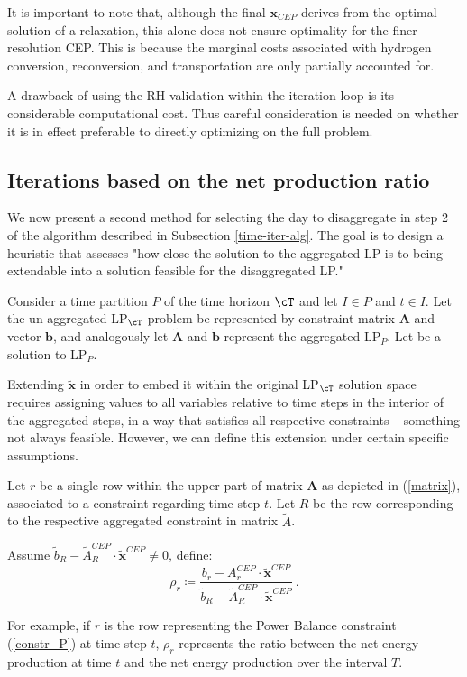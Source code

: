 \documentclass[smallextended,natbib]{svjour3}       %
\numberwithin{definition}{section}
\numberwithin{theorem}{section}
\numberwithin{proposition}{section}
\begin{document}
It is important to note that, although the final $\mathbf{x}_{CEP}$ derives from the optimal solution of a relaxation, this alone does not ensure optimality for the finer-resolution CEP. 
This is because the marginal costs associated with hydrogen conversion, reconversion, and transportation are only partially accounted for.%

A drawback of using the RH validation within the iteration loop is its considerable computational cost. Thus careful consideration is needed on whether it is in effect preferable to directly optimizing on the full problem.

\subsection{Iterations based on the net production ratio}\label{subsection: rho}  

We now present a second method for selecting the day to disaggregate in step 2 of the algorithm described in Subsection \ref{time-iter-alg}. 
The goal is to design a heuristic that assesses "how close the solution to the aggregated LP is to being extendable into a solution feasible for the disaggregated LP."

Consider a time partition $P$ of the time horizon $\cT$ and let \(I \in P\) and \(t \in I\).
Let the un-aggregated LP$_{\cT}$ problem be represented by constraint matrix $\mathbf{A}$ and vector $\mathbf{b}$, and analogously let $\tilde{\mathbf{A}}$ and $\tilde{\mathbf{b}}$ represent the aggregated LP$_P$.
Let  be a solution to LP$_P$.

Extending \(\tilde{\mathbf{x}}\) in order to embed it within the original LP{$_\cT$} solution space requires assigning values to all variables relative to time steps in the interior of the aggregated steps, in a way that satisfies all respective constraints -- something not always feasible.
However, we can define this extension under certain specific assumptions. %

\begin{definition}\label{def rho}
Let $r$ be a single row within the upper part of matrix $\mathbf{A}$ as depicted in (\ref{matrix}), associated to a constraint regarding time step $t$. 
Let $R$ be the row corresponding to the respective aggregated constraint in matrix $\tilde{A}$.

Assume \(\tilde{b}_R - \tilde{A}_R^{CEP}\cdot \tilde{\mathbf{x}}^{CEP} \neq 0\), define:
\[\rho_r \coloneqq \frac{b_r - A_r^{CEP} \cdot \tilde{\mathbf{x}}^{CEP}}{\tilde{b}_R - \tilde{A}_R^{CEP}\cdot \tilde{\mathbf{x}}^{CEP}}\  .\]
\end{definition}
For example, if $r$ is the row representing the Power Balance constraint (\ref{constr_P}) at time step $t$, \(\rho_r\) represents the ratio between the net energy production at time \(t\) and the net energy production over the interval \(T\).
\end{document}
